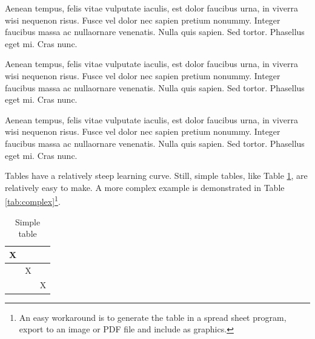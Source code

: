 Aenean tempus, felis vitae vulputate iaculis, est dolor faucibus urna, in viverra wisi nequenon risus. Fusce vel dolor nec sapien pretium nonummy. Integer faucibus massa ac nullaornare venenatis. Nulla quis sapien. Sed tortor. Phasellus eget mi. Cras nunc.

Aenean tempus, felis vitae vulputate iaculis, est dolor faucibus urna, in viverra wisi nequenon risus. Fusce vel dolor nec sapien pretium nonummy. Integer faucibus massa ac nullaornare venenatis. Nulla quis sapien. Sed tortor. Phasellus eget mi. Cras nunc.

Aenean tempus, felis vitae vulputate iaculis, est dolor faucibus urna, in viverra wisi nequenon risus. Fusce vel dolor nec sapien pretium nonummy. Integer faucibus massa ac nullaornare venenatis. Nulla quis sapien. Sed tortor. Phasellus eget mi. Cras nunc.

Tables have a relatively steep learning curve.
Still, simple tables, like Table \ref{tab:simple}, are relatively easy to make.
A more complex example is demonstrated in Table \ref{tab:complex}\footnote{An easy workaround is to generate the table in a spread sheet program, export to an image or PDF file and include as graphics.}.

\begin{table}[!htbp]
\centering
\begin{tabular}{c|c|c}
X &  & \\
\hline
& X & \\
\hline
 &  & X \\
\end{tabular}
\caption{Simple table}
\label{tab:simple}
\end{table}

\begin{table}[!htbp]
\centering
{}
\caption{Complex table}
\label{tab:complex}
\end{table}

